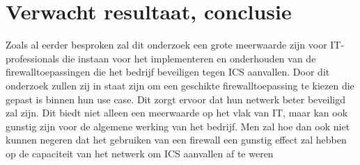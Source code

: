 \section{Verwacht resultaat, conclusie}%
\label{sec:verwachte_resultaten}

Zoals al eerder besproken zal dit onderzoek een grote meerwaarde zijn voor IT-professionals die instaan voor het implementeren en onderhouden van de firewalltoepassingen die het bedrijf beveiligen tegen ICS aanvallen. Door dit onderzoek zullen zij in staat zijn om een geschikte firewalltoepassing te kiezen die gepast is binnen hun use case. Dit zorgt ervoor dat hun netwerk beter beveiligd zal zijn. Dit biedt niet alleen een meerwaarde op het vlak van IT, maar kan ook gunstig zijn voor de algemene werking van het bedrijf. Men zal hoe dan ook niet kunnen negeren dat het gebruiken van een firewall een gunstig effect zal hebben op de capaciteit van het netwerk om ICS aanvallen af te weren


